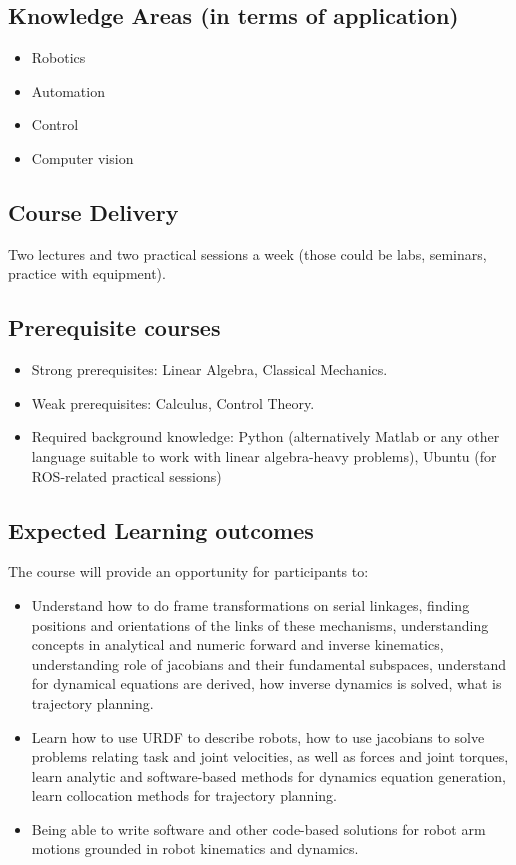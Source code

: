 

\subsection{Knowledge Areas (in terms of application)}

\begin{itemize}
    \item Robotics
    \item Automation
    \item Control
    \item Computer vision
\end{itemize}

\subsection{Course Delivery}

Two lectures and two practical sessions a week (those could be labs, seminars, practice with equipment). 

\subsection{Prerequisite courses}

\begin{itemize}
    \item Strong prerequisites: Linear Algebra, Classical Mechanics.
    \item Weak prerequisites: Calculus, Control Theory.
    \item Required background knowledge: Python (alternatively Matlab or any other language suitable to work with linear algebra-heavy problems), Ubuntu (for ROS-related practical sessions) 
\end{itemize}

\subsection{Expected Learning outcomes}

The course will provide an opportunity for participants to:

\begin{itemize}
    \item Understand how to do frame transformations on serial linkages, finding positions and orientations of the links of these mechanisms, understanding concepts in analytical and numeric forward and inverse kinematics, understanding role of jacobians and their fundamental subspaces, understand for dynamical equations are derived, how inverse dynamics is solved, what is trajectory planning.
    \item Learn how to use URDF to describe robots, how to use jacobians to solve problems relating task and joint velocities, as well as forces and joint torques, learn analytic and software-based methods for dynamics equation generation, learn collocation methods for trajectory planning.
    \item Being able to write software and other code-based solutions for robot arm motions grounded in robot kinematics and dynamics.
\end{itemize}

